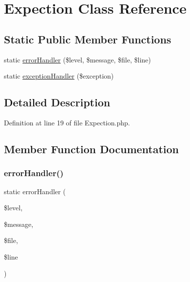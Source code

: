 \hypertarget{class_zest_1_1_expection_1_1_expection}{}\section{Expection Class Reference}
\label{class_zest_1_1_expection_1_1_expection}
\subsection*{Static Public Member Functions}
\begin{DoxyCompactItemize}
\item 
static \mbox{\hyperlink{class_zest_1_1_expection_1_1_expection_a46e0f2d0f32696429bd0232c4adc77ad}{error\+Handler}} (\$level, \$message, \$file, \$line)
\item 
static \mbox{\hyperlink{class_zest_1_1_expection_1_1_expection_a156452ce157308c974bf0944e9f8bde8}{exception\+Handler}} (\$exception)
\end{DoxyCompactItemize}


\subsection{Detailed Description}


Definition at line 19 of file Expection.\+php.



\subsection{Member Function Documentation}
\mbox{\label{class_zest_1_1_expection_1_1_expection_a46e0f2d0f32696429bd0232c4adc77ad}} 
\subsubsection{\texorpdfstring{error\+Handler()}{errorHandler()}}
{\footnotesize\ttfamily static error\+Handler (\begin{DoxyParamCaption}\item[{}]{\$level,  }\item[{}]{\$message,  }\item[{}]{\$file,  }\item[{}]{\$line }\end{DoxyParamCaption})\hspace{0.3cm}{\ttfamily [static]}}


